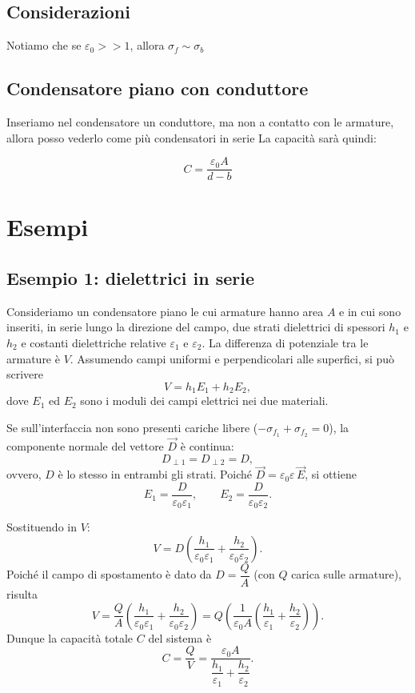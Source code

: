 \documentclass{book}
\begin{document}
\subsection{Considerazioni}




Notiamo che se $\varepsilon_0 >> 1$, allora $\sigma_f \sim \sigma_b$

\subsection{Condensatore piano con conduttore}
Inseriamo nel condensatore un conduttore, ma non a contatto con le armature, allora posso vederlo come più condensatori in serie
La capacità sarà quindi:


$$
C = \frac{\varepsilon_0 A}{d-b}
$$






\section{Esempi}

\subsection*{Esempio 1: dielettrici in serie}

Consideriamo un condensatore piano le cui armature hanno area \(A\) e in cui sono inseriti, in serie lungo la direzione del campo, due strati dielettrici di spessori \(h_1\) e \(h_2\) e costanti dielettriche relative \(\varepsilon_1\) e \(\varepsilon_2\). La differenza di potenziale tra le armature è \(V\). Assumendo campi uniformi e perpendicolari alle superfici, si può scrivere
\[
V = h_1 E_1 + h_2 E_2,
\]
dove \(E_1\) ed \(E_2\) sono i moduli dei campi elettrici nei due materiali.

Se sull'interfaccia non sono presenti cariche libere ($-\sigma_{{f}_{1}}+ \sigma_{{f}_{2}} = 0$), la componente normale del vettore \(\vec{D}\) è continua:
\[
D_{\perp1} = D_{\perp2} = D,
\]
ovvero, \(D\) è lo stesso in entrambi gli strati. Poiché \(\vec{D}=\varepsilon_0\varepsilon\,\vec{E}\), si ottiene
\[
E_1 = \frac{D}{\varepsilon_0\varepsilon_1},\qquad
E_2 = \frac{D}{\varepsilon_0\varepsilon_2}.
\]

Sostituendo in \(V\):
\[
V = D\left(\frac{h_1}{\varepsilon_0\varepsilon_1}+\frac{h_2}{\varepsilon_0\varepsilon_2}\right).
\]
Poiché il campo di spostamento è dato da \(D = \dfrac{Q}{A}\) (con \(Q\) carica sulle armature), risulta
\[
V = \frac{Q}{A}\left(\frac{h_1}{\varepsilon_0\varepsilon_1}+\frac{h_2}{\varepsilon_0\varepsilon_2}\right)
= Q\left(\frac{1}{\varepsilon_0 A}\left(\frac{h_1}{\varepsilon_1}+\frac{h_2}{\varepsilon_2}\right)\right).
\]
Dunque la capacità totale \(C\) del sistema è
\[
C=\frac{Q}{V}=\frac{\varepsilon_0 A}{\dfrac{h_1}{\varepsilon_1}+\dfrac{h_2}{\varepsilon_2}}.
\]
\end{document}
